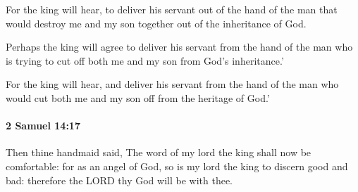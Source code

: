 			\begin{versebox}
					\item[BHS] 
					\item[ASV] For the king will hear, to deliver his servant out of the hand of the man that would destroy me and my son together out of the inheritance of God.
					\item[NIV] Perhaps the king will agree to deliver his servant from the hand of the man who is trying to cut off both me and my son from God’s inheritance.’
					\item[NRSV] For the king will hear, and deliver his servant from the hand of the man who would cut both me and my son off from the heritage of God.’
			\end{versebox}

		\paragraph{2 Samuel 14:17} %
			\label{2SAMUEL-14-17}

			Then thine handmaid said, The word of my lord the king shall now be comfortable: for as an angel of God, so is my lord the king to discern good and bad: therefore the LORD thy God will be with thee.

